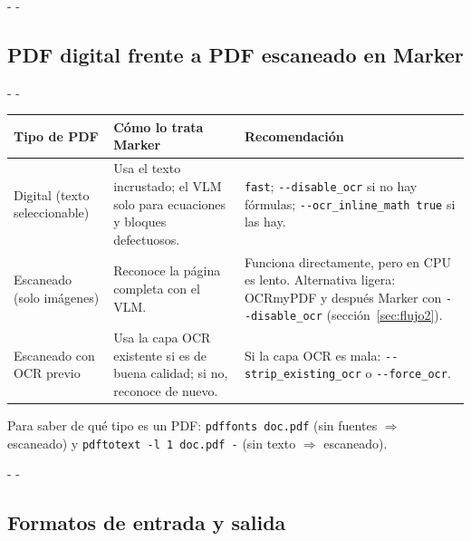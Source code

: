 \documentclass[11pt,a4paper]{article}
\makeatletter
\newcommand{\necesitaespacio}[1]{\par\penalty-100\begingroup
	\setlength{\dimen@}{#1}\dimen@ii\pagegoal\advance\dimen@ii-\pagetotal
	\ifdim\dimen@>\dimen@ii\ifdim\dimen@ii>\z@\vfil\fi\penalty-\@M\fi\endgroup}
\newcommand{\cmd}[1]{\texttt{\textcolor{colcmd}{#1}}}      %
\newcommand{\opt}[1]{\texttt{\textcolor{colopt}{#1}}}      %
\newcommand{\val}[1]{\texttt{#1}}                          %
\newcommand{\cab}[1]{\textbf{#1}}
\makeatother
\begin{document}
	\necesitaespacio{22\baselineskip}
	\subsection{PDF digital frente a PDF escaneado en Marker}
	
	\begingroup\small
	\necesitaespacio{18\baselineskip}
	\begin{longtable}{L{3.1cm}L{6.0cm}L{5.96cm}}
		\toprule{}\cab{Tipo de PDF} & \cab{Cómo lo trata Marker} & \cab{Recomendación}\\\midrule
		\endfirsthead
		\bottomrule
		\endfoot
		Digital (texto seleccionable) & Usa el texto incrustado; el VLM solo para ecuaciones y bloques defectuosos. & \val{fast}; \opt{-{}-disable\_ocr} si no hay fórmulas; \opt{-{}-ocr\_\allowbreak{}inline\_\allowbreak{}math true} si las hay.\\*
		Escaneado (solo imágenes) & Reconoce la página completa con el VLM. & Funciona directamente, pero en CPU es lento. Alternativa ligera: OCRmyPDF y después Marker con \opt{-{}-disable\_ocr} (sección~\ref{sec:flujo2}).\\*
		Escaneado con OCR previo & Usa la capa OCR existente si es de buena calidad; si no, reconoce de nuevo. & Si la capa OCR es mala: \opt{-{}-strip\_\allowbreak{}existing\_\allowbreak{}ocr} o \opt{-{}-force\_ocr}.\\
	\end{longtable}
	\endgroup
	
	Para saber de qué tipo es un PDF: \cmd{pdffonts doc.pdf} (sin fuentes $\Rightarrow$ escaneado) y \cmd{pdftotext -l 1 doc.pdf -} (sin texto $\Rightarrow$ escaneado).
	
	\necesitaespacio{29\baselineskip}
	\subsection{Formatos de entrada y salida}
	
\end{document}
